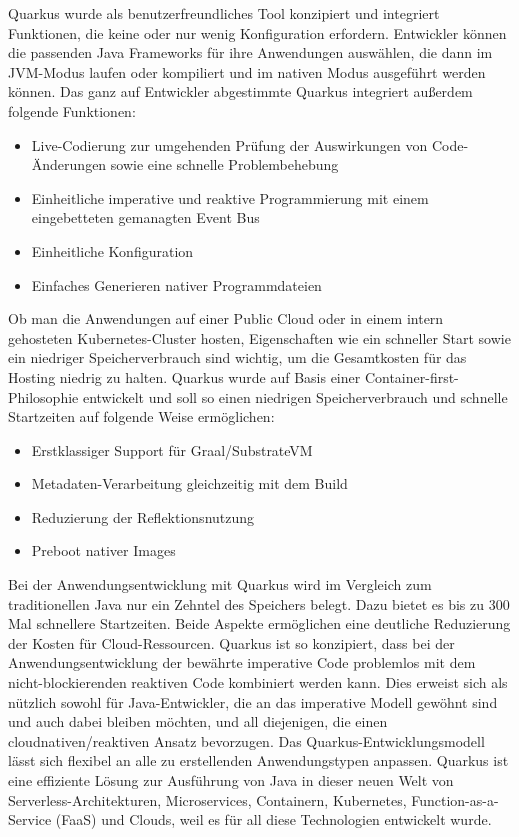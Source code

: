 Quarkus wurde als benutzerfreundliches Tool konzipiert und integriert Funktionen, die keine oder nur wenig Konfiguration erfordern.
Entwickler können die passenden Java Frameworks für ihre Anwendungen auswählen, die dann im JVM-Modus laufen oder kompiliert und im nativen Modus ausgeführt werden können.
Das ganz auf Entwickler abgestimmte Quarkus integriert außerdem folgende Funktionen:
\begin{itemize}
    \item Live-Codierung zur umgehenden Prüfung der Auswirkungen von Code-Änderungen sowie eine schnelle Problembehebung
    \item Einheitliche imperative und reaktive Programmierung mit einem eingebetteten gemanagten Event Bus
    \item Einheitliche Konfiguration
    \item Einfaches Generieren nativer Programmdateien
\end{itemize}
Ob man die Anwendungen auf einer Public Cloud oder in einem intern gehosteten Kubernetes-Cluster hosten, Eigenschaften wie ein schneller 
Start sowie ein niedriger Speicherverbrauch sind wichtig, um die Gesamtkosten für das Hosting niedrig zu halten.
Quarkus wurde auf Basis einer Container-first-Philosophie entwickelt und soll so einen niedrigen Speicherverbrauch und schnelle Startzeiten auf folgende Weise ermöglichen:
\begin{itemize}
    \item Erstklassiger Support für Graal/SubstrateVM
    \item Metadaten-Verarbeitung gleichzeitig mit dem Build
    \item Reduzierung der Reflektionsnutzung
    \item Preboot nativer Images
\end{itemize}
Bei der Anwendungsentwicklung mit Quarkus wird im Vergleich zum traditionellen Java nur ein Zehntel des Speichers belegt. Dazu bietet es bis zu 300 Mal 
schnellere Startzeiten. Beide Aspekte ermöglichen eine deutliche Reduzierung der Kosten für Cloud-Ressourcen.
Quarkus ist so konzipiert, dass bei der Anwendungsentwicklung der bewährte imperative Code problemlos mit dem nicht-blockierenden reaktiven Code kombiniert werden kann.
Dies erweist sich als nützlich sowohl für Java-Entwickler, die an das imperative Modell gewöhnt sind und auch dabei bleiben möchten, und all diejenigen, die einen cloudnativen/reaktiven Ansatz bevorzugen.
Das Quarkus-Entwicklungsmodell lässt sich flexibel an alle zu erstellenden Anwendungstypen anpassen.
Quarkus ist eine effiziente Lösung zur Ausführung von Java in dieser neuen Welt von Serverless-Architekturen, Microservices, Containern, Kubernetes, 
Function-as-a-Service (FaaS) und Clouds, weil es für all diese Technologien entwickelt wurde.
\cite{sysarch-quarkus-1}

